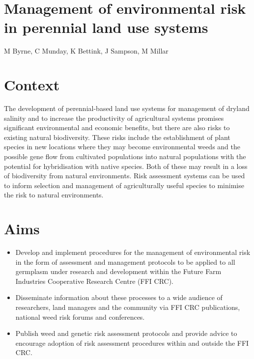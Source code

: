 \documentclass[version=last, 
    paper=a4, %
    10pt, %
    usenames,
    dvipsnames, 
    oneside, %
    headings=openany, %
    DIV=15 %
]{scrbook}
\begin{document}
\section*{Management of environmental risk in perennial land use systems
}

M Byrne, C Munday, K Bettink, J Sampson, M Millar


\section*{Context}
The development of perennial-based land use systems for management of
dryland salinity and to increase the productivity of agricultural
systems promises significant environmental and economic benefits, but
there are also risks to existing natural biodiversity. These risks
include the establishment of plant species in new locations where they
may become environmental weeds and the possible gene flow from
cultivated populations into natural populations with the potential for
hybridisation with native species. Both of these may result in a loss of
biodiversity from natural environments. Risk assessment systems can be
used to inform selection and management of agriculturally useful species
to minimise the risk to natural environments.



\section*{Aims}
\begin{itemize}
\itemsep1pt\parskip0pt
\item
  Develop and implement procedures for the management of environmental
  risk in the form of assessment and management protocols to be applied
  to all germplasm under research and development within the Future Farm
  Industries Cooperative Research Centre (FFI CRC).
\item
  Disseminate information about these processes to a wide audience of
  researchers, land managers and the community via FFI CRC publications,
  national weed risk forums and conferences.
\item
  Publish weed and genetic risk assessment protocols and provide advice
  to encourage adoption of risk assessment procedures within and outside
  the FFI CRC.
\end{itemize}
\end{document}
